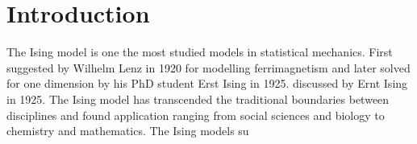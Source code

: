 \section{Introduction}

The Ising model is one the most studied models in statistical mechanics. First
suggested by Wilhelm Lenz in 1920 for modelling ferrimagnetism and later solved
for one dimension by his PhD student Erst Ising in 1925.  
discussed by Ernt Ising in 1925. The Ising model has
transcended the traditional boundaries between disciplines and  found
application ranging from social sciences and biology to chemistry and
mathematics. The Ising models su       


